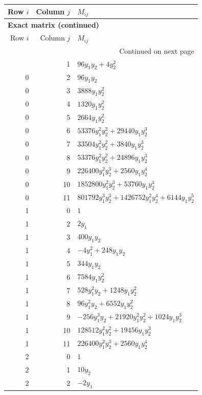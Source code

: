 \documentclass[10pt,a4paper]{article}
\begin{document}
{\small\setlength{\tabcolsep}{7pt}\begin{longtable}{rrp{125mm}}
\toprule Row $i$ & Column $j$ & $M_{ij}$\\\midrule\endfirsthead
\multicolumn{3}{l}{\textbf{Exact matrix (continued)}}\\
\toprule Row $i$ & Column $j$ & $M_{ij}$\\\midrule\endhead
\midrule\multicolumn{3}{r}{Continued on next page}\\\endfoot\bottomrule\endlastfoot
0 & 1 & $96 y_{1} y_{2} + 4 y_{2}^{2}$\\
0 & 2 & $96 y_{1} y_{2}$\\
0 & 3 & $3888 y_{1} y_{2}^{2}$\\
0 & 4 & $1320 y_{1} y_{2}^{2}$\\
0 & 5 & $2664 y_{1} y_{2}^{2}$\\
0 & 6 & $53376 y_{1}^{2} y_{2}^{2} + 29440 y_{1} y_{2}^{3}$\\
0 & 7 & $33504 y_{1}^{2} y_{2}^{2} + 3840 y_{1} y_{2}^{3}$\\
0 & 8 & $53376 y_{1}^{2} y_{2}^{2} + 24896 y_{1} y_{2}^{3}$\\
0 & 9 & $226400 y_{1}^{2} y_{2}^{3} + 2560 y_{1} y_{2}^{4}$\\
0 & 10 & $1852800 y_{1}^{2} y_{2}^{3} + 53760 y_{1} y_{2}^{4}$\\
0 & 11 & $801792 y_{1}^{3} y_{2}^{3} + 1426752 y_{1}^{2} y_{2}^{4} + 6144 y_{1} y_{2}^{5}$\\
1 & 0 & $1$\\
1 & 2 & $2 y_{1}$\\
1 & 3 & $400 y_{1} y_{2}$\\
1 & 4 & $- 4 y_{1}^{2} + 248 y_{1} y_{2}$\\
1 & 5 & $344 y_{1} y_{2}$\\
1 & 6 & $7584 y_{1} y_{2}^{2}$\\
1 & 7 & $528 y_{1}^{2} y_{2} + 1248 y_{1} y_{2}^{2}$\\
1 & 8 & $96 y_{1}^{2} y_{2} + 6552 y_{1} y_{2}^{2}$\\
1 & 9 & $- 256 y_{1}^{3} y_{2} + 21920 y_{1}^{2} y_{2}^{2} + 1024 y_{1} y_{2}^{3}$\\
1 & 10 & $128512 y_{1}^{2} y_{2}^{2} + 19456 y_{1} y_{2}^{3}$\\
1 & 11 & $226400 y_{1}^{2} y_{2}^{3} + 2560 y_{1} y_{2}^{4}$\\
2 & 0 & $1$\\
2 & 1 & $10 y_{2}$\\
2 & 2 & $- 2 y_{1}$\\

\end{longtable}}
\end{document}

